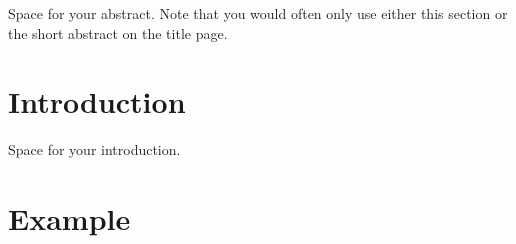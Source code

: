 \documentclass[a4paper,oneside,10pt,ngerman,english]{scrartcl}
\begin{document}



\cleardoubleoddpage


Space for your abstract.
Note that you would often only use either this section or the short abstract on the title page.




\cleardoubleoddpage

\section{Introduction}
\label{sec:introduction}

Space for your introduction.


\section{Example}
\label{sec:example}
\end{document}
